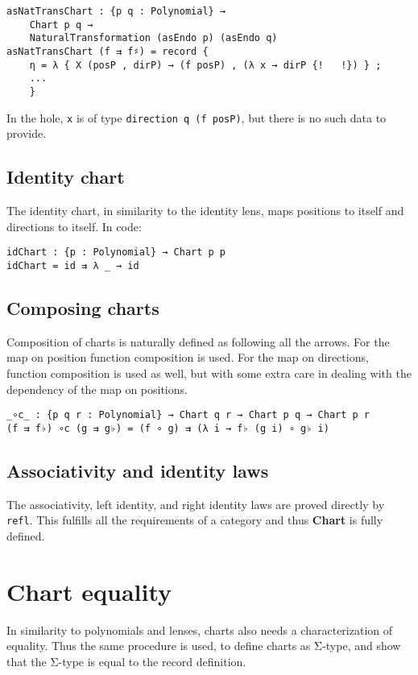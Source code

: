 \begin{verbatim}
asNatTransChart : {p q : Polynomial} → 
    Chart p q → 
    NaturalTransformation (asEndo p) (asEndo q)
asNatTransChart (f ⇉ f♯) = record { 
    η = λ { X (posP , dirP) → (f posP) , (λ x → dirP {!   !}) } ; 
    ... 
    }
\end{verbatim}
In the hole, \texttt{x} is of type \texttt{direction q (f posP)}, but there is no such data to provide.

\subsection{Identity chart}
The identity chart, in similarity to the identity lens, maps positions to itself and directions to itself. In code:

\begin{verbatim}
idChart : {p : Polynomial} → Chart p p
idChart = id ⇉ λ _ → id
\end{verbatim}

\subsection{Composing charts}
Composition of charts is naturally defined as following all the arrows. For the map on position function composition is used. For the map on directions, function composition is used as well, but with some extra care in dealing with the dependency of the map on positions. 
\begin{verbatim}
_∘c_ : {p q r : Polynomial} → Chart q r → Chart p q → Chart p r
(f ⇉ f♭) ∘c (g ⇉ g♭) = (f ∘ g) ⇉ (λ i → f♭ (g i) ∘ g♭ i)
\end{verbatim}

\subsection{Associativity and identity laws}
The associativity, left identity, and right identity laws are proved directly by \texttt{refl}. This fulfills all the requirements of a category and thus \textbf{Chart} is fully defined.


\section{Chart equality}
In similarity to polynomials and lenses, charts also needs a characterization of equality. Thus the same procedure is used, to define charts as Σ-type, and show that the Σ-type is equal to the record definition.

